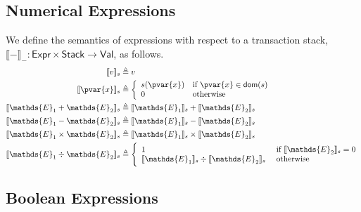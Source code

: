 \subsection{Numerical Expressions}

We define the semantics of expressions with respect to a transaction stack, $\llbracket - \rrbracket_- : \mathsf{Expr} \times \mathsf{Stack} \rightarrow \mathsf{Val}$, as follows.
\begin{align*}
\llbracket v \rrbracket_s &\triangleq v \\
\llbracket \pvar{x} \rrbracket_s &\triangleq
\bigg\{ \begin{array}{l l}
s(\pvar{x}) &\text{if } \pvar{x} \in \textsf{dom}(s)\\
0&\text{otherwise}
\end{array} \\
\llbracket \mathds{E}_1 + \mathds{E}_2 \rrbracket_s &\triangleq \llbracket \mathds{E}_1 \rrbracket_s + \llbracket \mathds{E}_2 \rrbracket_s \\
\llbracket \mathds{E}_1 - \mathds{E}_2 \rrbracket_s &\triangleq \llbracket \mathds{E}_1 \rrbracket_s - \llbracket \mathds{E}_2 \rrbracket_s \\
\llbracket \mathds{E}_1 \times \mathds{E}_2 \rrbracket_s &\triangleq \llbracket \mathds{E}_1 \rrbracket_s \times \llbracket \mathds{E}_2 \rrbracket_s \\
\llbracket \mathds{E}_1 \div \mathds{E}_2 \rrbracket_s &\triangleq 
\Bigg\{ \begin{array}{l l}
1 &\text{ if } \llbracket \mathds{E}_2 \rrbracket_s = 0 \\
\llbracket \mathds{E}_1 \rrbracket_s \div \llbracket \mathds{E}_2 \rrbracket_s &\text{ otherwise} \\
\end{array}
\end{align*}

\subsection{Boolean Expressions}


